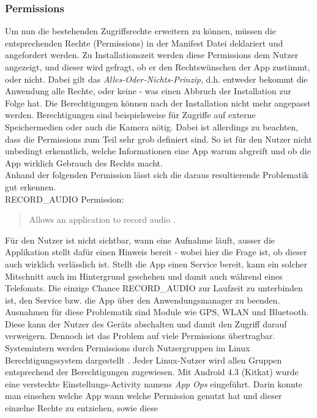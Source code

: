 	\subsubsection{Permissions}
	Um nun die bestehenden Zugriffsrechte erweitern zu können, müssen die
	entsprechenden Rechte (Permissions) in der Manifest Datei deklariert und
	angefordert werden. Zu Installationszeit werden diese Permissions dem Nutzer
	angezeigt, und dieser wird gefragt, ob er den Rechtswünschen der App zustimmt,
	oder nicht. Dabei gilt das \textit{Alles-Oder-Nichts-Prinzip}, d.h. entweder
	bekommt die Anwendung alle Rechte, oder keine - was einen Abbruch der
	Installation zur Folge hat. Die Berechtigungen können nach der Installation nicht mehr
	angepasst werden. Berechtigungen sind beispielsweise für Zugriffe auf externe
	Speichermedien oder auch die Kamera nötig. Dabei ist allerdings zu beachten,
	dass die Permissions zum Teil sehr grob definiert sind. So ist für den Nutzer
	nicht unbedingt erkenntlich, welche Informationen eine App warum abgreift und
	ob die App wirklich Gebrauch des Rechts macht.\\
	Anhand der folgenden Permission lässt sich die daraus resultierende Problematik
	gut erkennen.\\
	RECORD\_AUDIO Permission:
	\begin{quote}
		Allows an application to record audio \cite{RECORD_AUDIO}.
	\end{quote} 
	Für den Nutzer ist nicht sichtbar, wann eine Aufnahme läuft, ausser die
	Applikation stellt dafür einen Hinweis bereit - wobei hier die Frage ist, ob
	dieser auch wirklich verlässlich ist. Stellt die App einen Service bereit,
	kann ein solcher Mitschnitt auch im Hintergrund geschehen und damit auch
	während eines Telefonats. Die einzige Chance RECORD\_AUDIO zur Laufzeit zu
	unterbinden ist, den Service bzw. die App über den Anwendungsmanager zu
	beenden. Ausnahmen für diese Problematik sind Module wie GPS, WLAN und
	Bluetooth. Diese kann der Nutzer des Geräts abschalten und damit den Zugriff
	darauf verweigern.
	Dennoch ist das Problem auf viele Permissions übertragbar.\\
	Systemintern werden Permissions durch Nutzergruppen im Linux
	Berechtigungssystem dargestellt \cite[S. 28]{Drake2014}. Jeder Linux-Nutzer
	wird allen Gruppen entsprechend der Berechtigungen zugewiesen.
	Mit Android 4.3 (Kitkat) wurde eine versteckte Einstellungs-Activity namens
	\textit{App Ops} eingeführt. Darin konnte man einsehen welche App wann welche
	Permission genutzt hat und dieser einzelne Rechte zu entziehen, sowie diese
